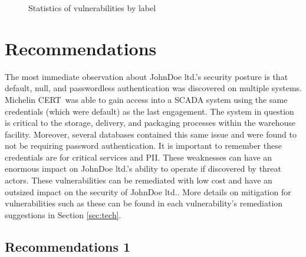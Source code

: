 \documentclass[12pt, table,dvipsnames]{article}
\newcommand{\client}{JohnDoe ltd.} %
\newcommand{\teamname}{Michelin CERT}
\begin{document}
\begin{figure}[H]
    \centering
    \caption{Statistics of vulnerabilities by label}
\end{figure}
\newpage

\section{Recommendations}
The most immediate observation about \client's security posture is that default, null, and passwordless authentication was discovered on multiple systems. \teamname\ was able to gain access into a SCADA system using the same credentials (which were default) as the last engagement.  The system in question is critical to the storage, delivery, and packaging processes within the warehouse facility. Moreover, several databases contained this same issue and were found to not be requiring password authentication. It is important to remember these credentials are for critical services and PII. These weaknesses can have an enormous impact on \client's ability to operate if discovered by threat actors. These vulnerabilities can be remediated with low cost and have an outsized impact on the security of \client. More details on mitigation for vulnerabilities such as these can be found in each vulnerability's remediation suggestions in Section \ref{sec:tech}. 

\subsection{Recommendations 1}
\end{document}
